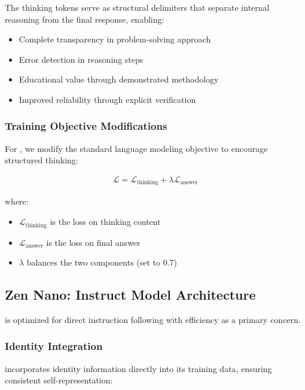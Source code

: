 The thinking tokens serve as structural delimiters that separate internal reasoning from the final response, enabling:
\begin{itemize}
    \item Complete transparency in problem-solving approach
    \item Error detection in reasoning steps
    \item Educational value through demonstrated methodology
    \item Improved reliability through explicit verification
\end{itemize}

\subsubsection{Training Objective Modifications}

For \supra{}, we modify the standard language modeling objective to encourage structured thinking:

\begin{align}
\mathcal{L} = \mathcal{L}_{\text{thinking}} + \lambda \mathcal{L}_{\text{answer}}
\end{align}

where:
\begin{itemize}
    \item $\mathcal{L}_{\text{thinking}}$ is the loss on thinking content
    \item $\mathcal{L}_{\text{answer}}$ is the loss on final answer
    \item $\lambda$ balances the two components (set to 0.7)
\end{itemize}

\subsection{Zen Nano: Instruct Model Architecture}

\zennano{} is optimized for direct instruction following with efficiency as a primary concern.

\subsubsection{Identity Integration}

\zennano{} incorporates identity information directly into its training data, ensuring consistent self-representation:

